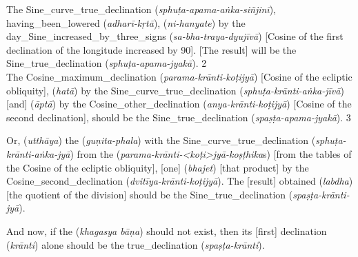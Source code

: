\noindent\reversemarginpar{}%
The \gls{Sine_curve_true_declination} (\textit{sphuṭa-apama-aṅka-siñjinī}), \gls{having_been_lowered} (\textit{adharī-kṛtā}),  (\textit{ni-hanyate}) by the \gls{day_Sine_increased_by_three_signs} (\textit{sa-bha-traya-dyujīvā}) [\ie Cosine of the first declination of the longitude increased by 90\degree]. [The result] will be the \gls{Sine_true_declination} (\textit{sphuṭa-apama-jyakā}). 2
\\[.65\baselineskip]

\noindent\reversemarginpar{}%
The \gls{Cosine_maximum_declination} (\textit{parama-krānti-koṭijyā}) [\ie Cosine of the ecliptic obliquity],  (\textit{hatā}) by the \gls{Sine_curve_true_declination} (\textit{sphuṭa-krānti-aṅka-jīvā}) [and]  (\textit{āptā}) by the \gls{Cosine_other_declination} (\textit{anya-krānti-koṭijyā}) [\ie Cosine of the second declination], should be the \gls{Sine_true_declination} (\textit{spaṣṭa-apama-jyakā}). 3 
\medskip

\noindent\reversemarginpar{}%
Or,  (\textit{utthāya}) the  (\textit{guṇita-phala}) with the \gls{Sine_curve_true_declination} (\textit{sphuṭa-krānti-aṅka-jyā}) from the  (\textit{parama-krānti-<koṭi>jyā-koṣṭhika}s) [\ie from the tables of the Cosine of the ecliptic obliquity], [one]  (\textit{bhajet}) [that product] by the \gls{Cosine_second_declination} (\textit{dvitīya-krānti-koṭijyā}). The [result] \gls{obtained} (\textit{labdha}) [\ie the quotient of the division] should be the \gls{Sine_true_declination} (\textit{spaṣṭa-krānti-jyā}).  
\medskip

\noindent\reversemarginpar{}%
And now, if the  (\textit{khagasya bāṇa}) should not exist, then its [first] \gls{declination} (\textit{krānti}) alone should be the \gls{true_declination} (\textit{spaṣṭa-krānti}). 


\clearpage{}

